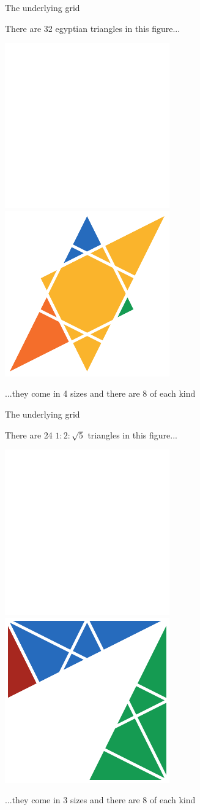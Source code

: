 \documentclass[14pt]{beamer}
\begin{document}
    \begin{frame}{The underlying grid}
        \begin{center}
            There are 32 egyptian triangles in this figure...

            \bigskip \bigskip

            \includegraphics[height=18ex]{figures/figure002b.pdf}\qquad
            \includegraphics[height=18ex]{figures/figure002c.pdf}\\

            \bigskip \bigskip

            ...they come in 4 sizes and there are 8 of each kind
        \end{center}
    \end{frame}


    \begin{frame}{The underlying grid}
        \begin{center}
            There are 24 $1\!\!:\!\!2\!\!:\!\!\sqrt{5}$ triangles in this figure...

            \bigskip \bigskip

            \includegraphics[height=18ex]{figures/figure002b.pdf}\qquad
            \includegraphics[height=18ex]{figures/figure002d.pdf}\\

            \bigskip \bigskip

            ...they come in 3 sizes and there are 8 of each kind
        \end{center}
    \end{frame}
\end{document}
